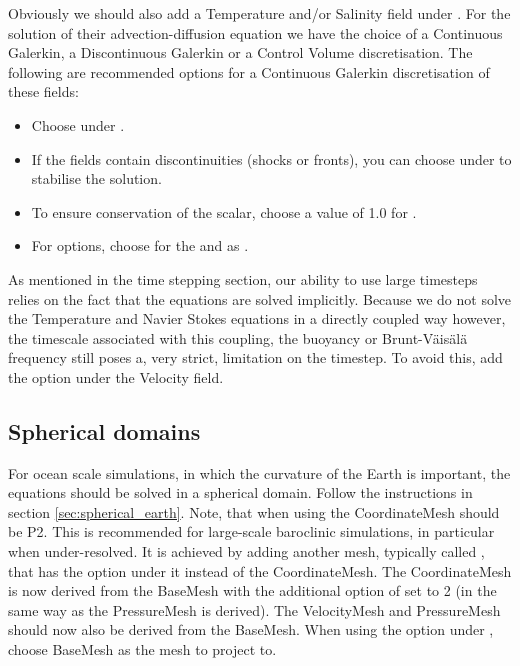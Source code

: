 Obviously we should also add a Temperature and/or Salinity field under
. For the solution of their advection-diffusion
equation we have the choice of a Continuous Galerkin, a Discontinuous Galerkin
or a Control Volume discretisation. The following are recommended options for a
Continuous Galerkin discretisation of these fields:
\begin{itemize}
  \item Choose  under
    . 
  \item If the fields contain discontinuities (shocks or fronts), you can
    choose  under
     to stabilise the
    solution.
  \item To ensure conservation of the scalar, choose a value of 1.0 for
    . 
  \item For  options, choose  for the
     and  as .
\end{itemize}

As mentioned in the time stepping section, our ability to use large timesteps
relies on the fact that the equations are solved implicitly. Because we do not
solve the Temperature and Navier Stokes equations in a directly coupled way
however, the timescale associated with this coupling, the buoyancy or
Brunt-V\"ais\"al\"a frequency still poses a, very strict, limitation on the timestep. To
avoid this, add the option
 under the Velocity
field.

\subsection{Spherical domains}
\label{sec:ocean_on_the_sphere}
For ocean scale simulations, in which the curvature of the Earth is important,
the equations should be solved in a spherical domain. Follow the instructions
in section \ref{sec:spherical_earth}. Note, that when using
 the CoordinateMesh should be P2. This is
recommended for large-scale baroclinic simulations, in particular when
under-resolved. It is
achieved by adding another mesh, typically called , that has the
 option under it instead of the CoordinateMesh. The
CoordinateMesh is now derived from the BaseMesh with the additional option of
 set to 2 (in the same way as the PressureMesh is
derived). The VelocityMesh and PressureMesh should now also be derived from the
BaseMesh. When using the option  under
,
choose BaseMesh as the mesh to project to.

